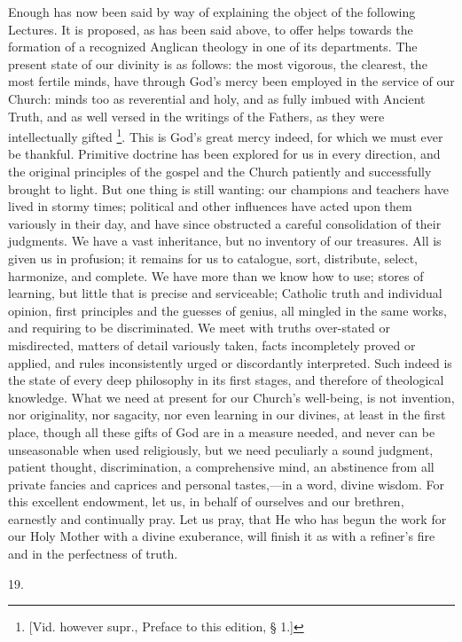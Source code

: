 Enough has now been said by way of explaining the object of the
following Lectures. It is proposed, as has been said above, to offer
helps towards the formation of a recognized Anglican theology in one
of its departments. The present state of our divinity is as follows:
the most vigorous, the clearest, the most fertile minds, have through
God's mercy been employed in the service of our Church: minds too as
reverential and holy, and as fully imbued with Ancient Truth, and as
well versed in the writings of the Fathers, as they were
intellectually gifted \footnote{[Vid. however supr., Preface to this
edition, § 1.]}.
This is God's great mercy indeed, for which we must ever be
thankful. Primitive doctrine has been explored for us in every
direction, and the original principles of the gospel and the Church
patiently and successfully brought to light. But one thing is still
wanting: our champions and teachers have lived in stormy times;
political and other influences have acted upon them variously in their
day, and have since obstructed a careful consolidation of their
judgments. We have a vast inheritance, but no inventory of our
treasures. All is given us in profusion; it remains for us to
catalogue, sort, distribute, select, harmonize, and complete. We have
more than we know how to use; stores of learning, but little that is
precise and serviceable; Catholic truth and individual opinion, first
principles and the guesses of genius, all mingled in the same works,
and requiring to be discriminated. We meet with truths over-stated or
misdirected, matters of detail variously taken, facts incompletely
proved or applied, and rules inconsistently urged or discordantly
interpreted. Such indeed is the state of every deep philosophy in
its first stages, and therefore of theological knowledge. What we need
at present for our Church's well-being, is not invention, nor
originality, nor sagacity, nor even learning in our divines, at least
in the first place, though all these gifts of God are in a measure
needed, and never can be unseasonable when used religiously, but we
need peculiarly a sound judgment, patient thought, discrimination, a
comprehensive mind, an abstinence from all private fancies and
caprices and personal tastes,—in a word, divine wisdom. For this
excellent endowment, let us, in behalf of ourselves and our brethren,
earnestly and continually pray. Let us pray, that He who has begun the
work for our Holy Mother with a divine exuberance, will finish it as
with a refiner's fire and in the perfectness of truth.

19.

